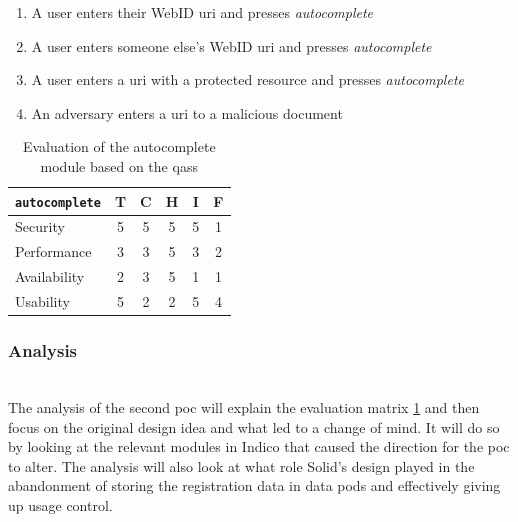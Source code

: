 \begin{enumerate}
    \item A user enters their WebID \gls{uri} and presses \textit{autocomplete}
    \item A user enters someone else's WebID \gls{uri} and presses \textit{autocomplete}
    \item A user enters a \gls{uri} with a protected resource and presses \textit{autocomplete}
    \item An adversary enters a \gls{uri} to a malicious document
\end{enumerate}

\begin{table}[h!]
    \centering
    \begin{tabular}{| l | c | c | c | c | c |} 
     \hline
     \texttt{autocomplete} & T & C & H & I & F \\
     \hline
     Security & 5 & 5 & 5 & 5 & \cellcolor{green!25}1\\
     \hline
     Performance & 3 & 3 & 5 & 3 & \cellcolor{green!25}2\\
     \hline
     Availability & 2 & 3 & 5 & 1 & \cellcolor{green!25}1\\
     \hline
     Usability & 5 & 2 & 2 & 5 & \cellcolor{red!25}4\\
     \hline
    \end{tabular}
    \vspace{0.75cm}
    \caption{Evaluation of the autocomplete module based on the \glspl{qas}}
    \label{table:poc2-evaluation}
\end{table}
\subsubsection{Analysis}\label{poc2:analysis}\mbox{}\\

The analysis of the second \gls{poc} will explain the evaluation matrix \ref{table:poc2-evaluation} and then focus on the original design idea and what led to a change of mind. It will do so by looking at the relevant modules in Indico that caused the direction for the \gls{poc} to alter.  The analysis will also look at what role Solid's design played in the abandonment of storing the registration data in data pods and effectively giving up usage control.

\vspace{0.5cm}

